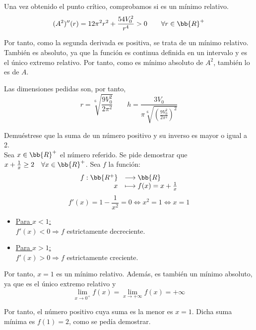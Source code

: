 \begin{ejercicio}
    Una vez obtenido el punto crítico, comprobamos si es un mínimo relativo.
    \begin{equation*}
        (A^2)''(r) = 12\pi^2r^2 + \frac{54V_0^2}{r^4} >0 \qquad \forall r\in \bb{R}^+
    \end{equation*}

    Por tanto, como la segunda derivada es positiva, se trata de un mínimo relativo. También es absoluto, ya que la función es continua definida en un intervalo y es el único extremo relativo. Por tanto, como es mínimo absoluto de $A^2$, también lo es de $A$.
    
    Las dimensiones pedidas son, por tanto,
    \begin{equation*}
         r=\sqrt[6]{\frac{9V_0^2}{2\pi^2}} \qquad h=\frac{3V_0}{\pi \sqrt[6]{\left(\frac{9V_0^2}{2\pi^2}\right)^2}}
    \end{equation*}
\end{ejercicio}

\begin{ejercicio}
    Demuéstrese que la suma de un número positivo y su inverso es mayor o igual a 2.\\

    Sea $x\in \bb{R}^+$ el número referido. Se pide demostrar que $x+\frac{1}{x} \geq 2 \quad \forall x\in \bb{R}^+$. Sea $f$ la función:
    \begin{equation*}
        \begin{array}{rl}
            f:\bb{R^+} & \longrightarrow \bb{R}\\
                    x & \longmapsto f(x)=x+\frac{1}{x}
        \end{array}
    \end{equation*}
    \begin{equation*}
        f'(x)=1-\frac{1}{x^2} = 0\Longleftrightarrow x^2=1 \Longleftrightarrow x=1
    \end{equation*}

    \begin{itemize}
        \item \underline{Para $x<1$:}\\
        $f'(x)<0 \Longrightarrow f$ estrictamente decreciente.
        \item \underline{Para $x>1$:}\\
        $f'(x)>0 \Longrightarrow f$ estrictamente creciente.
    \end{itemize}

    Por tanto, $x=1$ es un mínimo relativo. Además, es también un mínimo absoluto, ya que es el único extremo relativo y
    $$\lim_{x\to0^+}f(x)= \lim_{x\to+\infty}f(x) = +\infty$$

    Por tanto, el número positivo cuya suma es la menor es $x=1$. Dicha suma mínima es $f(1)=2$, como se pedía demostrar.
\end{ejercicio}

